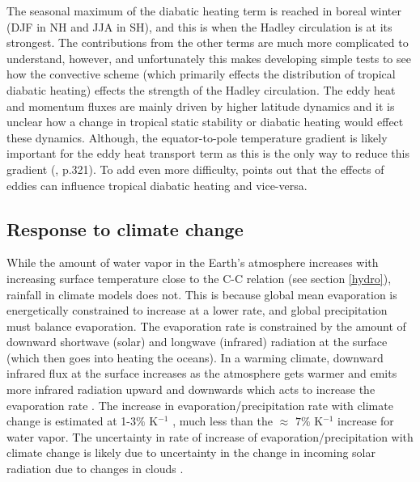 \documentclass[letterpaper,12pt,titlepage,oneside,final]{book}
\begin{document}
The seasonal maximum of the diabatic heating term is reached in boreal winter (DJF in NH and JJA in SH), and this is when the Hadley circulation is at its strongest. The contributions from the other terms are much more complicated to understand, however, and unfortunately this makes developing simple tests to see how the convective scheme (which primarily effects the distribution of tropical diabatic heating) effects the strength of the Hadley circulation. The eddy heat and momentum fluxes are mainly driven by higher latitude dynamics and it is unclear how a change in tropical static stability or diabatic heating would effect these dynamics. Although, the equator-to-pole temperature gradient is likely important for the eddy heat transport term as this is the only way to reduce this gradient (\citep{holton_introduction_2004}, p.321). To add even more difficulty, \citep{kim_hadley_2001} points out that the effects of eddies can influence tropical diabatic heating and vice-versa.
\subsection{Response to climate change}\label{response}

While the amount of water vapor in the Earth's atmosphere increases with increasing surface temperature close to the C-C relation (see section \ref{hydro}), rainfall in climate models does not. This is because global mean evaporation is energetically constrained to increase at a lower rate, and global precipitation must balance evaporation. The evaporation rate is constrained by the amount of downward shortwave (solar) and longwave (infrared) radiation at the surface (which then goes into heating the oceans). In a warming climate, downward infrared flux at the surface increases as the atmosphere gets warmer and emits more infrared radiation upward and downwards which acts to increase the evaporation rate \citep{boer_climate_1993}. The increase in evaporation/precipitation rate with climate change is estimated at 1-3$\%$ K$^{-1}$ \citep{schneider_water_2010,he_anthropogenic_2015,boer_climate_1993}, much less than the $\approx$ $7 \%$ K$^{-1}$ increase for water vapor. The uncertainty in rate of increase of evaporation/precipitation with climate change is likely due to uncertainty in the change in incoming solar radiation due to changes in clouds \citep{allen_constraints_2002}.
\end{document}
